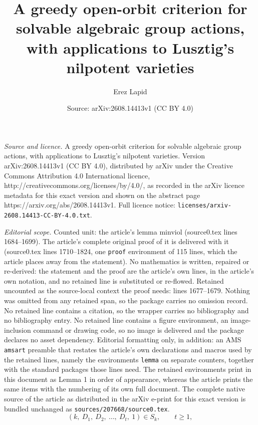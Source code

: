 \documentclass[10pt,a4paper]{amsart}
\title{A greedy open-orbit criterion for solvable algebraic group actions, with applications to Lusztig's nilpotent varieties}
\author{Erez Lapid}
\date{Source: arXiv:2608.14413v1 (CC BY 4.0)}
\begin{document}
\maketitle

\noindent\emph{Source and licence.} A greedy open-orbit criterion for solvable algebraic group actions, with applications to Lusztig's nilpotent varieties. Version arXiv:2608.14413v1 (CC BY 4.0), distributed by arXiv under the Creative Commons Attribution 4.0 International licence, http://creativecommons.org/licenses/by/4.0/, as recorded in the arXiv licence metadata for this exact version and shown on the abstract page https://arxiv.org/abs/2608.14413v1. Full licence notice: \texttt{licenses/arxiv-2608.14413-CC-BY-4.0.txt}.\par\smallskip

\noindent\textit{Editorial scope.} Counted unit: the article's lemma minviol (source0.tex lines 1684--1699). The article's complete original proof of it is delivered with it (source0.tex lines 1710--1824, one \texttt{proof} environment of 115 lines, which the article places away from the statement). No mathematics is written, repaired or re-derived: the statement and the proof are the article's own lines, in the article's own notation, and no retained line is substituted or re-flowed.  Retained uncounted as the source-local context the proof needs: lines 1677--1679.  Nothing was omitted from any retained span, so the package carries no omission record.  No retained line contains a citation, so the wrapper carries no bibliography and no bibliography entry.  No retained line contains a figure environment, an image-inclusion command or drawing code, so no image is delivered and the package declares no asset dependency.  Editorial formatting only, in addition: an AMS \texttt{amsart} preamble that restates the article's own declarations and macros used by the retained lines, namely the environments \texttt{lemma} on separate counters, together with the standard packages those lines need.  The retained environments print in this document as Lemma 1 in order of appearance, whereas the article prints the same items with the numbering of its own full document.  The complete native source of the article as distributed in the arXiv e-print for this exact version is bundled unchanged as \texttt{sources/207668/source0.tex}.
\begin{equation} \label{eq: famI}
(k,\ D_1,\ D_2,\ \dots,\ D_t,\ 1)\in S_k,\qquad t\ge1,
\end{equation}
\end{document}
